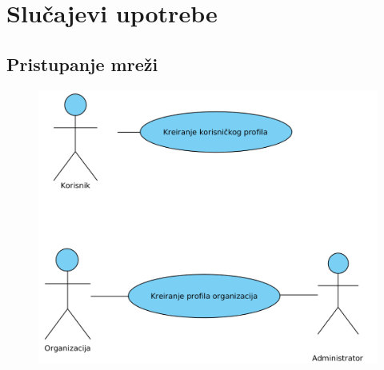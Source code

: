\section{Slučajevi upotrebe}

\subsection{Pristupanje mreži}

\begin{figure}[h!]
		\centerline{\includegraphics[width=\textwidth]{slike/pridruzivanje.png}}
\end{figure}

